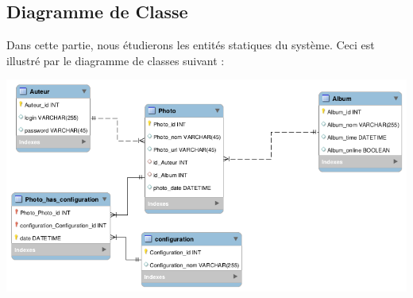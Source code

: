 \documentclass[12pt]{article}
\begin{document}
	
	\newpage
	\subsection{Diagramme de Classe}
	Dans cette partie, nous étudierons les entités statiques du système. Ceci est illustré par le diagramme de classes suivant :
	\vspace{1.5cm}	
	
	\includegraphics[scale =0.5 ,width=\textwidth]{diagrammeclasse.png}
	
	
\end{document}
